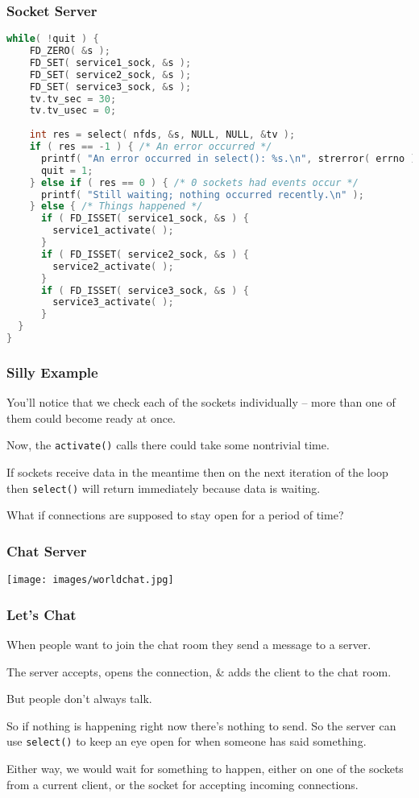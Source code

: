 \begin{frame}[fragile]
	\frametitle{Socket Server}

	\begin{lstlisting}[language=C]
while( !quit ) {
    FD_ZERO( &s );
    FD_SET( service1_sock, &s );
    FD_SET( service2_sock, &s );
    FD_SET( service3_sock, &s );
    tv.tv_sec = 30;
    tv.tv_usec = 0;
  
    int res = select( nfds, &s, NULL, NULL, &tv );
    if ( res == -1 ) { /* An error occurred */
      printf( "An error occurred in select(): %s.\n", strerror( errno ) );
      quit = 1;
    } else if ( res == 0 ) { /* 0 sockets had events occur */
      printf( "Still waiting; nothing occurred recently.\n" );
    } else { /* Things happened */
      if ( FD_ISSET( service1_sock, &s ) {
        service1_activate( ); 
      }
      if ( FD_ISSET( service2_sock, &s ) {
        service2_activate( ); 
      }
      if ( FD_ISSET( service3_sock, &s ) {
        service3_activate( ); 
      }
  }
}
\end{lstlisting}

\end{frame}


\begin{frame}
	\frametitle{Silly Example}

	You'll notice that we check each of the sockets individually -- more than one of them could become ready at once.

	Now, the \texttt{activate()} calls there could take some nontrivial time.

	If sockets receive data in the meantime then on the next iteration of the loop then \texttt{select()} will return immediately because data is waiting.

	What if connections are supposed to stay open for a period of time?

\end{frame}


\begin{frame}
	\frametitle{Chat Server}

	\begin{center}
		\texttt{[image: images/worldchat.jpg]}
	\end{center}

\end{frame}

\begin{frame}
	\frametitle{Let's Chat}

	When people want to join the chat room they send a message to a server.

	The server accepts, opens the connection, \& adds the client to the chat room.

	But people don't always talk.

	So if nothing is happening right now there's nothing to send. So the server can use \texttt{select()} to keep an eye open for when someone has said something.

	Either way, we would wait for something to happen, either on one of the sockets from a current client, or the socket for accepting incoming connections.

\end{frame}


